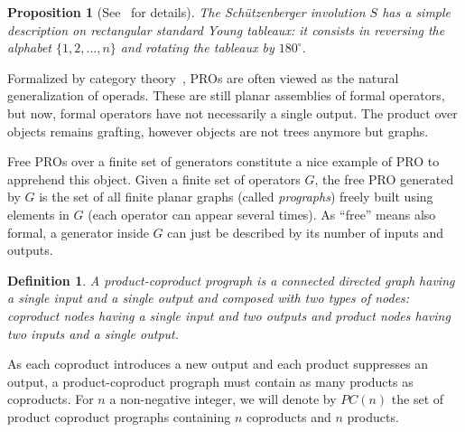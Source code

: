 \documentclass{amsart}
\newtheorem{proposition}[theorem]{Proposition}
\newtheorem{definition}[theorem]{Definition}
\begin{document}
\begin{proposition}[See~\cite{stan_schutz, Pon_Wang} for details]
  The Schützenberger involution $S$ has a simple description on rectangular
  standard Young tableaux: it consists in reversing the alphabet
  $\{1, 2, \dots , n \}$ and rotating the tableaux by $180^{\circ}$.
\end{proposition}


Formalized by category theory~\cite{Mac_Lane}, PROs are often viewed as the
natural generalization of operads. These are still planar assemblies
of formal operators, but now, formal operators have not necessarily a
single output. The product over objects remains grafting, however
objects are not trees anymore but graphs.


Free PROs over a finite set of
generators constitute a nice example of PRO to apprehend this
object. Given a finite set of operators $G$, the free PRO generated by
$G$ is the set of all finite planar graphs (called \emph{prographs}) freely
built using elements in $G$ (each operator can appear several
times). As ``free'' means also formal, a generator inside $G$ can
just be described by its number of inputs and outputs.


\begin{definition}
A \emph{product-coproduct prograph} is a connected directed graph having
a single input and a single output and composed with two types of
nodes: coproduct nodes having a single input and two outputs
and product nodes having two inputs and a single output.
\end{definition}


As each coproduct introduces a new output and each product
suppresses an output, a product-coproduct prograph must
contain as many products as coproducts. For $n$ a non-negative integer,
we will denote by $PC(n)$ the set of product coproduct prographs
containing $n$ coproducts and $n$ products.
\end{document}
